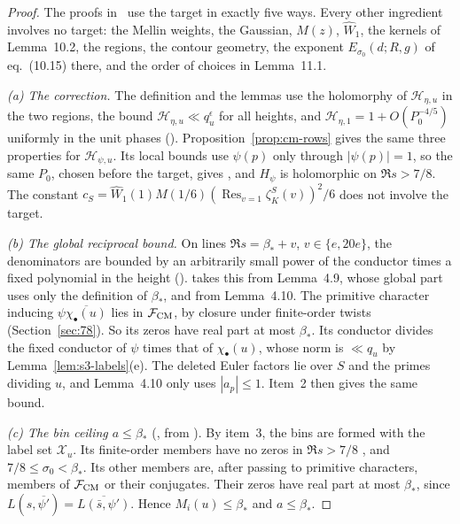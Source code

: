 \documentclass[11pt]{article}
\numberwithin{equation}{section}
\begin{document}
\begin{proof}
The proofs in~\cite[Sections~10--11]{OAI78} use the target in exactly five ways. Every other ingredient involves no
target: the Mellin weights, the Gaussian, $M(z)$, $\widehat W_1$, the kernels of
Lemma~10.2, the regions, the contour geometry, the exponent
$E_{\sigma_0}(d;R,g)$ of eq.~(10.15) there, and the order of choices in Lemma~11.1.

\emph{(a) The correction.} The definition and the lemmas use the holomorphy of $\mathcal H_{\eta,u}$ in the two
regions, the bound $\mathcal H_{\eta,u}\ll q_u^\epsilon$ for all heights, and
$\mathcal H_{\eta,1}=1+O(P_0^{-4/5})$ uniformly in the unit phases (\cite[Sections~10.1 and~10.5]{OAI78}).
Proposition~\ref{prop:cm-rows} gives the same three properties for $\mathcal H_{\psi,u}$. Its local bounds use
$\psi(p)$ only through $|\psi(p)|=1$, so the same $P_0$, chosen before the target, gives
\cite[eq.~(10.2)]{OAI78}, and $H_\psi$ is holomorphic on $\Re s>7/8$. The constant
$c_S=\widehat W_1(1)M(1/6)(\operatorname{Res}_{v=1}\zeta_K^S(v))^2/6$ does not involve the target.

\emph{(b) The global reciprocal bound.} On lines $\Re s=\beta_*+v$, $v\in\{e,20e\}$, the denominators are
bounded by an arbitrarily small power of the conductor times a fixed polynomial in the height (\cite[proof of Lemma~10.3; proof of Lemma~10.5; proof of Lemma~10.6]{OAI78}). \cite{OAI78} takes this from
Lemma~4.9, whose global part uses only the definition of $\beta_*$, and from
Lemma~4.10. The primitive character inducing $\psi\overline{\chi_\bullet(u)}$ lies in
$\mathcal F_{\rm CM}$, by closure under finite-order twists (Section~\ref{sec:78}). So its zeros have real
part at most $\beta_*$. Its conductor divides the fixed conductor of $\psi$ times that of $\chi_\bullet(u)$,
whose norm is $\ll q_u$ by Lemma~\ref{lem:s3-labels}(e). The deleted Euler factors lie over $S$ and the primes
dividing $u$, and Lemma~4.10 only uses $|a_p|\le1$. Item~2 then gives the same bound.

\emph{(c) The bin ceiling $a\le\beta_*$} (\cite[proof of Lemma~10.3]{OAI78}, from \cite[Section~8.1]{OAI78}). By item~3, the bins are formed with the
label set $\mathcal X_u$. Its finite-order members have no zeros in $\Re s>7/8$ \cite[Theorem~1.1]{OAI78},
and $7/8\le\sigma_0<\beta_*$. Its other members are, after passing to primitive characters, members of
$\mathcal F_{\rm CM}$ or their conjugates. Their zeros have real part at most $\beta_*$, since
$L(s,\overline{\psi'})=\overline{L(\bar s,\psi')}$. Hence $M_i(u)\le\beta_*$ and $a\le\beta_*$.


\end{proof}
\end{document}
